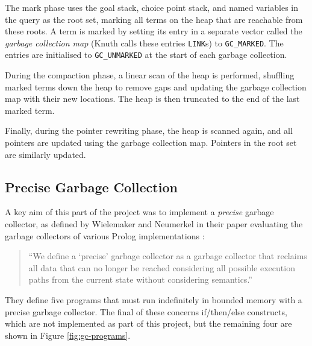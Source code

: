 The mark phase uses the goal stack, choice point stack, and named variables in the query as the root set, marking all terms on the heap that are reachable from these roots. A term is marked by setting its entry in a separate vector called the \emph{garbage collection map} (Knuth calls these entries \texttt{LINK}s) to \texttt{GC\_MARKED}. The entries are initialised to \texttt{GC\_UNMARKED} at the start of each garbage collection.

During the compaction phase, a linear scan of the heap is performed, shuffling marked terms down the heap to remove gaps and updating the garbage collection map with their new locations. The heap is then truncated to the end of the last marked term.

Finally, during the pointer rewriting phase, the heap is scanned again, and all pointers are updated using the garbage collection map. Pointers in the root set are similarly updated.

\subsection{Precise Garbage Collection}

A key aim of this part of the project was to implement a \emph{precise} garbage collector, as defined by Wielemaker and Neumerkel in their paper evaluating the garbage collectors of various Prolog implementations \cite{wielemakerPreciseGarbageCollection2008}:

\begin{quote}
``We define a `precise' garbage collector as a garbage collector that reclaims all data that can no longer be reached considering all possible execution paths from the current state without considering semantics.''
\end{quote}

They define five programs that must run indefinitely in bounded memory with a precise garbage collector. The final of these concerns if/then/else constructs, which are not implemented as part of this project, but the remaining four are shown in Figure \ref{fig:gc-programs}.

